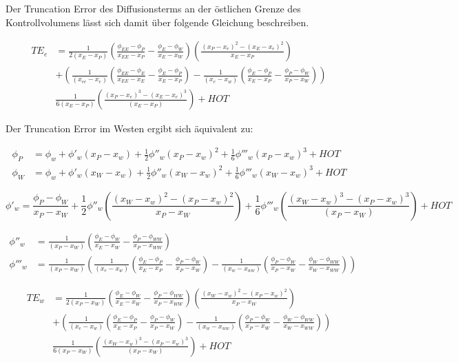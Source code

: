 \documentclass[10pt, ngerman,colorback,accentcolor=tud2d]{tudreport}
\begin{document}
Der Truncation Error des Diffusionsterms an der östlichen Grenze des Kontrollvolumens
lässt sich damit über folgende Gleichung beschreiben.

\begin{align*}
  {TE}_e &= \frac{1}{2 (x_E-x_P)}\left({
\frac{\phi_{EE}-\phi_P}{x_{EE}-x_P}-\frac{\phi_E-\phi_W}{x_E-x_W}}\right) \left({\frac{{(x_P-x_e)}^2-{(x_E-x_e)}^2}{x_E-x_P}}\right)\\
&+
\left({
\frac{1}{(x_{ee}-x_e)}
\left({\frac{\phi_{EE}-\phi_E}{x_{EE}-x_E}-\frac{\phi_E-\phi_P}{x_E-x_P} }\right)
-\frac{1}{(x_e-x_w)}
\left({\frac{\phi_E-\phi_P}{x_E-x_P} - \frac{\phi_P-\phi_W}{x_P-x_W}  }\right)
}\right)\\
&\frac{1}{6(x_E-x_P)}\left({\frac{{(x_P-x_e)}^3-{(x_E-x_e)}^3}{(x_E-x_P)}}\right)
+HOT
\end{align*}

Der Truncation Error im Westen ergibt sich äquivalent zu:

\begin{align}
  \phi_P &= \phi_w + \phi'_w(x_P-x_w)+\frac{1}{2}\phi''_w(x_P-x_w)^2
  +\frac{1}{6}\phi'''_w(x_P-x_w)^3+HOT
  \label{eq:taylor_wP}\\
  \phi_W &= \phi_w + \phi'_w(x_W-x_w)+\frac{1}{2}\phi''_w(x_W-x_w)^2
  +\frac{1}{6}\phi'''_w(x_W-x_w)^3+HOT
  \label{eq:taylor_eP}
\end{align}

\begin{equation}
  \phi'_w = \frac{\phi_P-\phi_W}{x_P-x_W}+\frac{1}{2}\phi''_w
\left({\frac{{(x_W-x_w)}^2-{(x_P-x_w)}^2}{x_P-x_W}}\right)+
\frac{1}{6} \phi'''_w \left({\frac{{(x_W-x_w)}^3-{(x_P-x_w)}^3}{(x_P-x_W)}}\right)+HOT
\end{equation}

\begin{align*}
  \phi''_w &= \frac{1}{(x_P-x_W)}\left({
\frac{\phi_{E}-\phi_W}{x_{E}-x_W}-\frac{\phi_P-\phi_{WW}}{x_P-x_{WW}}}\right)\\
 \phi'''_w &= \frac{1}{(x_P-x_W)}\left({
\frac{1}{(x_e-x_w)}
\left({\frac{\phi_E-\phi_P}{x_E-x_P}-\frac{\phi_P-\phi_W}{x_P-x_W} }\right)
-\frac{1}{(x_w-x_{ww})}
\left({\frac{\phi_P-\phi_W}{x_P-x_W} - \frac{\phi_W-\phi_{WW}}{x_W-x_{WW}}  }\right)
}\right)
\end{align*}

\begin{align*}
  TE_w &= \frac{1}{2 (x_P-x_W)} \left({
\frac{\phi_{E}-\phi_W}{x_{E}-x_W}-\frac{\phi_P-\phi_{WW}}{x_P-x_{WW}}}\right)
  \left({\frac{{(x_W-x_w)}^2-{(x_P-x_w)}^2}{x_P-x_W}}\right)\\
&+
\left({
\frac{1}{(x_e-x_w)}
\left({\frac{\phi_E-\phi_P}{x_E-x_P}-\frac{\phi_P-\phi_W}{x_P-x_W} }\right)
-\frac{1}{(x_w-x_{ww})}
\left({\frac{\phi_P-\phi_W}{x_P-x_W} - \frac{\phi_W-\phi_{WW}}{x_W-x_{WW}}  }\right)
}\right)\\
&\frac{1}{6(x_P-x_W)}\left({\frac{{(x_W-x_w)}^3-{(x_P-x_w)}^3}{(x_P-x_W)}}\right)
  +HOT
\end{align*}
\end{document}
